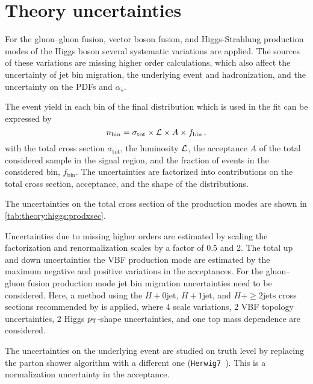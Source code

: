 \section{Theory uncertainties}\label{sec:systematics:theo}

\begin{description}[leftmargin=0cm]
    \item[Signal theory systmatics:] For the gluon--gluon fusion, vector boson fusion, and Higgs-Strahlung production
        modes of the Higgs boson several systematic variations are applied.
        The sources of these variations are missing higher order calculations, which also affect the uncertainty of jet bin migration,
        the underlying event and hadronization, and the uncertainty on the PDFs and $\alpha_s$.

        The event yield in each bin of the final distribution which is used in the fit can be expressed by
        \begin{equation}
            n_\text{bin}  = \sigma_\text{tot} \times \mathcal{L} \times A \times f_\text{bin} \,,
        \end{equation}
        with the total cross section $\sigma_\text{tot}$, the luminosity $\mathcal{L}$, the acceptance $A$ of the total considered sample in the signal region,
        and the fraction of events in the considered bin, $f_\text{bin}$.
        The uncertainties are factorized into contributions on the total cross section, acceptance, and the shape of the distributions.

        The uncertainties on the total cross section of the production modes are shown in \cref{tab:theory:higgs:prodxsec}.

        Uncertainties due to missing higher orders are estimated by scaling the factorization and renormalization scales by a factor of 0.5 and 2.
        The total up and down uncertainties the VBF production mode are estimated by the maximum negative and positive variations in the acceptances.
        For the gluon--gluon fusion production mode jet bin migration uncertainties need to be considered.
        Here, a method using the $H + 0 \text{jet}$, $H + 1 \text{jet}$, and $H+\geq2\text{jets}$ cross sections recommended by \cite{YR4}
        is applied, where 4 scale variations, 2 VBF topology uncertainties, 2 Higgs $p_\text{T}$-shape uncertainties, and one top mass dependence are considered.

        The uncertainties on the underlying event are studied on truth level by replacing the parton shower algorithm with a different one (\texttt{Herwig7}~\cite{Herwig7:1,Herwig7:2}).
        This is a normalization uncertainty in the acceptance.


\end{description}
